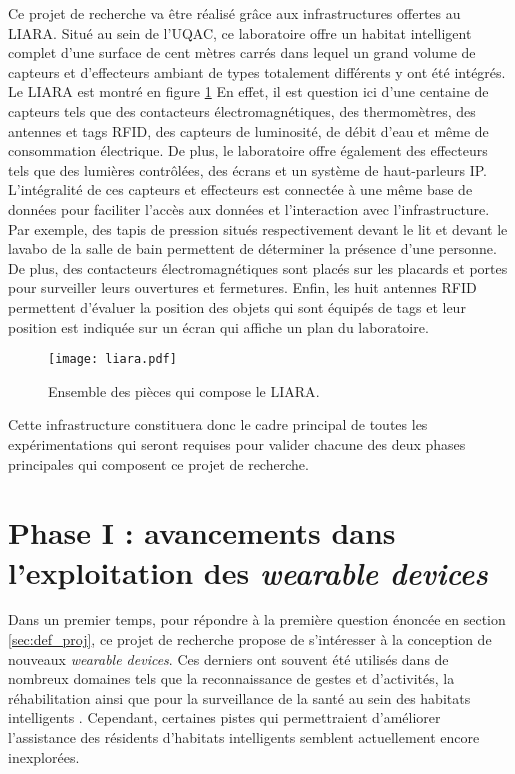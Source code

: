 Ce projet de recherche va être réalisé grâce aux infrastructures offertes au \acs{LIARA}. Situé au sein de l'\ac{UQAC}, ce laboratoire offre un habitat intelligent complet d’une surface de cent mètres carrés dans lequel un grand volume de capteurs et d'effecteurs ambiant de types totalement différents y ont été intégrés. Le \acs{LIARA} est montré en figure \ref{fig:liara} En effet, il est question ici d’une centaine de capteurs tels que des contacteurs électromagnétiques, des thermomètres, des antennes et tags \acs{RFID}, des capteurs de luminosité, de débit d’eau et même de consommation électrique. De plus, le laboratoire offre également des effecteurs tels que des lumières contrôlées, des écrans et un système de haut-parleurs IP. L’intégralité de ces capteurs et effecteurs est connectée à une même base de données pour faciliter l’accès aux données et l’interaction avec l’infrastructure. Par exemple, des tapis de pression situés respectivement devant le lit et devant le lavabo de la salle de bain permettent de déterminer la présence d'une personne. De plus, des contacteurs électromagnétiques sont placés sur les placards et portes pour surveiller leurs ouvertures et fermetures. Enfin, les huit antennes \acs{RFID} permettent d'évaluer la position des objets qui sont équipés de tags et leur position est indiquée sur un écran qui affiche un plan du laboratoire.

\begin{figure}[H]
	\centering
	\texttt{[image: liara.pdf]}
        \caption{Ensemble des pièces qui compose le \acs{LIARA}.}
	\label{fig:liara}
\end{figure}

Cette infrastructure constituera donc le cadre principal de toutes les expérimentations qui seront requises pour valider chacune des deux phases principales qui composent ce projet de recherche. 

\section{Phase I : avancements dans l'exploitation des \textit{wearable devices}}

Dans un premier temps, pour répondre à la première question énoncée en section \ref{sec:def_proj}, ce projet de recherche propose de s'intéresser à la conception de nouveaux \textit{wearable devices}. Ces derniers ont souvent été utilisés dans de nombreux domaines tels que la reconnaissance de gestes et d'activités, la réhabilitation ainsi que pour la surveillance de la santé au sein des habitats intelligents \citep{Khan2016, Davis2016, Chapron2018}. Cependant, certaines pistes qui permettraient d'améliorer l'assistance des résidents d'habitats intelligents semblent actuellement encore inexplorées. 

